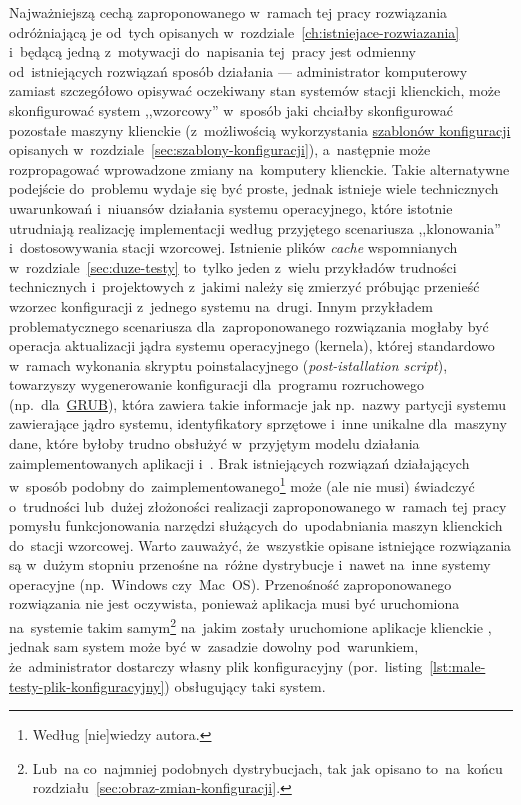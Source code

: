 \documentclass[thesis]{subfiles}
\begin{document}
Najważniejszą cechą zaproponowanego w~ramach tej pracy rozwiązania odróżniającą je od~tych opisanych w~rozdziale~\ref{ch:istniejace-rozwiazania} i~będącą jedną z~motywacji do~napisania tej~pracy jest odmienny od~istniejących rozwiązań sposób działania --- administrator komputerowy zamiast szczegółowo opisywać oczekiwany stan systemów stacji klienckich, może skonfigurować system ,,wzorcowy'' w~sposób jaki chciałby skonfigurować pozostałe maszyny klienckie (z~możliwością wykorzystania \hyperref[sec:szablony-konfiguracji]{szablonów konfiguracji} opisanych w~rozdziale~\ref{sec:szablony-konfiguracji}), a~następnie może rozpropagować wprowadzone zmiany na~komputery klienckie. Takie alternatywne podejście do~problemu wydaje się być proste, jednak istnieje wiele technicznych uwarunkowań i~niuansów działania systemu operacyjnego, które istotnie utrudniają realizację implementacji według przyjętego scenariusza ,,klonowania'' i~dostosowywania stacji wzorcowej. Istnienie plików \emph{cache} wspomnianych w~rozdziale~\ref{sec:duze-testy} to~tylko jeden z~wielu przykładów trudności technicznych i~projektowych z~jakimi należy się zmierzyć próbując przenieść wzorzec konfiguracji z~jednego systemu na~drugi. Innym przykładem problematycznego scenariusza dla~zaproponowanego rozwiązania mogłaby być operacja aktualizacji jądra systemu operacyjnego (kernela), której standardowo w~ramach wykonania skryptu poinstalacyjnego (\emph{post-istallation script}), towarzyszy wygenerowanie konfiguracji dla~programu rozruchowego (np.~dla~\href{https://en.wikipedia.org/wiki/GNU_GRUB}{GRUB}), która zawiera takie informacje jak np.~nazwy partycji systemu zawierające jądro systemu, identyfikatory sprzętowe i~inne unikalne dla~maszyny dane, które byłoby trudno obsłużyć w~przyjętym modelu działania zaimplementowanych aplikacji \texttt{\srvappname{}} i~\texttt{\cliappname{}}. Brak istniejących rozwiązań działających w~sposób podobny do~zaimplementowanego\footnote{Według [nie]wiedzy autora.} może (ale nie musi) świadczyć o~trudności lub~dużej złożoności realizacji zaproponowanego w~ramach tej pracy pomysłu funkcjonowania narzędzi służących do~upodabniania maszyn klienckich do~stacji wzorcowej. Warto zauważyć, że~wszystkie opisane istniejące rozwiązania są w~dużym stopniu przenośne na~różne dystrybucje i~nawet na~inne systemy operacyjne (np.~Windows czy~Mac~OS). Przenośność zaproponowanego rozwiązania nie jest oczywista, ponieważ aplikacja \texttt{\srvappname{}} musi być uruchomiona na~systemie takim samym\footnote{Lub~na co~najmniej podobnych dystrybucjach, tak jak opisano to~na~końcu rozdziału~\ref{sec:obraz-zmian-konfiguracji}.} na~jakim zostały uruchomione aplikacje klienckie \texttt{\cliappname{}}, jednak sam system może być w~zasadzie dowolny pod~warunkiem, że~administrator dostarczy własny plik konfiguracyjny (por.~listing~\ref{lst:male-testy-plik-konfiguracyjny}) obsługujący taki system.
\end{document}

